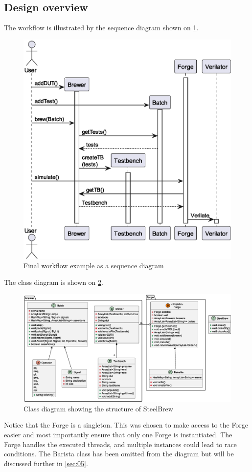 \subsection{Design overview}
The workflow is illustrated by the sequence diagram shown on \cref{fig:usecasesfinal}.
\begin{figure}
    \centering
    \caption{Final workflow example as a sequence diagram}\label{fig:usecasesfinal}
    \includegraphics[width=.5\textwidth]{out/plantuml/seq/sequenceDiag.eps}
\end{figure}
The class diagram is shown on \cref{fig:classDiag}.
\begin{figure}
    \centering
    \caption{Class diagram showing the structure of SteelBrew}\label{fig:classDiag}
    \includegraphics[width=\textwidth]{out/plantuml/classDiag/classDiag.eps}
\end{figure}
Notice that the Forge is a singleton. This was chosen to make access to the Forge easier and most importantly ensure that only one Forge is instantiated. The Forge handles the executed threads, and multiple instances could lead to race conditions. The Barista class has been omitted from the diagram but will be discussed further in \cref{sec:05}.